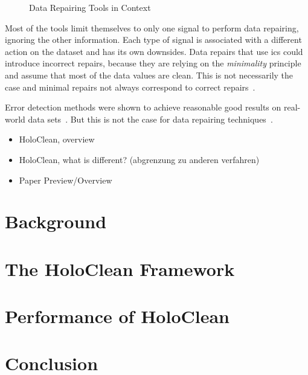 \begin{figure}[hbt]

    \caption{Data Repairing Tools in Context}
    \label{fig:tools}
  \end{figure}

  \bigskip
  Most of the tools limit themselves to only one signal to perform data repairing, ignoring the other information.
  Each type of signal is associated with a different action on the dataset and has its own downsides.
  Data repairs that use \glspl{ic} could introduce incorrect repairs, because they are relying on the \textit{minimality} principle and assume that most of the data values are clean.
  This is not necessarily the case and minimal repairs not always correspond to correct repairs~\cite{holoclean}.

  Error detection methods were shown to achieve reasonable good results on real-world data sets~\cite{errorDetectionSurvey}.
  But this is not the case for data repairing techniques~\cite{dataRepairingEvaluation}.

  \begin{itemize}
    \item HoloClean, overview
    \item HoloClean, what is different? (abgrenzung zu anderen verfahren)
    \item Paper Preview/Overview
  \end{itemize}


\section{Background}\label{sec:background}

\section{The HoloClean Framework}\label{sec:framework}

\section{Performance of HoloClean}\label{sec:performance}

\section{Conclusion}\label{sec:conclusion}